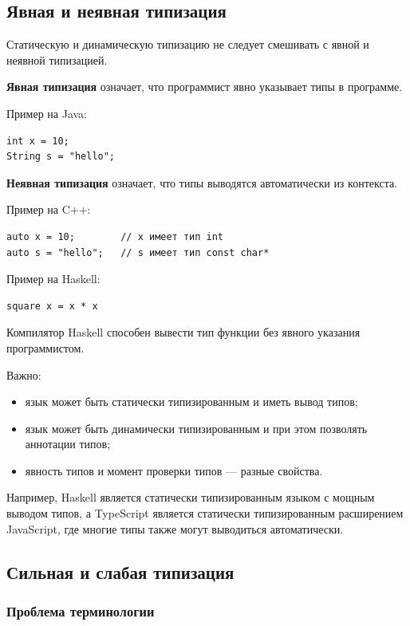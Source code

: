 \documentclass[12pt,a4paper]{article}
\begin{document}
\subsection{Явная и неявная типизация}

Статическую и динамическую типизацию не следует смешивать с явной и неявной
типизацией.

\textbf{Явная типизация} означает, что программист явно указывает типы в программе.

Пример на Java:

\begin{verbatim}
int x = 10;
String s = "hello";
\end{verbatim}

\textbf{Неявная типизация} означает, что типы выводятся автоматически из контекста.

Пример на C++:

\begin{verbatim}
auto x = 10;        // x имеет тип int
auto s = "hello";   // s имеет тип const char*
\end{verbatim}

Пример на Haskell:

\begin{verbatim}
square x = x * x
\end{verbatim}

Компилятор Haskell способен вывести тип функции без явного указания программистом.

Важно:

\begin{itemize}
    \item язык может быть статически типизированным и иметь вывод типов;
    \item язык может быть динамически типизированным и при этом позволять аннотации типов;
    \item явность типов и момент проверки типов --- разные свойства.
\end{itemize}

Например, Haskell является статически типизированным языком с мощным выводом типов,
а TypeScript является статически типизированным расширением JavaScript, где многие
типы также могут выводиться автоматически.

\subsection{Сильная и слабая типизация}

\subsubsection{Проблема терминологии}
\end{document}
